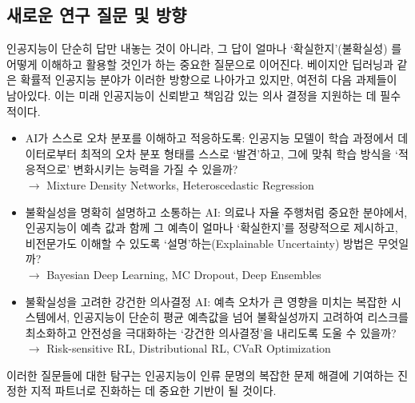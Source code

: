 \documentclass{article}
\begin{document}
\subsection{새로운 연구 질문 및 방향}
\label{subsec:future}
인공지능이 단순히 답만 내놓는 것이 아니라, 그 답이 얼마나 `확실한지'(불확실성) 를 어떻게 이해하고 활용할 것인가 하는 중요한 질문으로 이어진다. 베이지안 딥러닝과 같은 확률적 인공지능 분야가 이러한 방향으로 나아가고 있지만, 여전히 다음 과제들이 남아있다. 이는 미래 인공지능이 신뢰받고 책임감 있는 의사 결정을 지원하는 데 필수적이다.

\begin{itemize}
  \item AI가 스스로 오차 분포를 이해하고 적응하도록: 인공지능 모델이 학습 과정에서 데이터로부터 최적의 오차 분포 형태를 스스로 `발견'하고, 그에 맞춰 학습 방식을 `적응적으로' 변화시키는 능력을 가질 수 있을까?\\
    $\longrightarrow$ Mixture Density Networks, Heteroscedastic Regression
  \item 불확실성을 명확히 설명하고 소통하는 AI: 의료나 자율 주행처럼 중요한 분야에서, 인공지능이 예측 값과 함께 그 예측이 얼마나 `확실한지'를 정량적으로 제시하고, 비전문가도 이해할 수 있도록 `설명'하는(Explainable Uncertainty) 방법은 무엇일까?\\
    $\longrightarrow$ Bayesian Deep Learning, MC Dropout, Deep Ensembles
  \item 불확실성을 고려한 강건한 의사결정 AI: 예측 오차가 큰 영향을 미치는 복잡한 시스템에서, 인공지능이 단순히 평균 예측값을 넘어 불확실성까지 고려하여 리스크를 최소화하고 안전성을 극대화하는 `강건한 의사결정'을 내리도록 도울 수 있을까?\\
    $\longrightarrow$ Risk-sensitive RL, Distributional RL, CVaR Optimization
\end{itemize}

이러한 질문들에 대한 탐구는 인공지능이 인류 문명의 복잡한 문제 해결에 기여하는 진정한 지적 파트너로 진화하는 데 중요한 기반이 될 것이다.


% 	


\toctrue
\nocite{*}




\tocfalse
\end{document}
